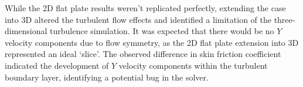 While the 2D flat plate results weren't replicated perfectly, extending the case into 3D altered the turbulent flow effects and identified a limitation of the three-dimensional turbulence simulation. It was expected that there would be no $Y$ velocity components due to flow symmetry, as the 2D flat plate extension into 3D represented an ideal `slice'. The observed difference in skin friction coefficient indicated the development of $Y$ velocity components within the turbulent boundary layer, identifying a potential bug in the solver. 
%
\begin{figure} [htbp]
	\centering
	\qquad
	

\end{figure}
